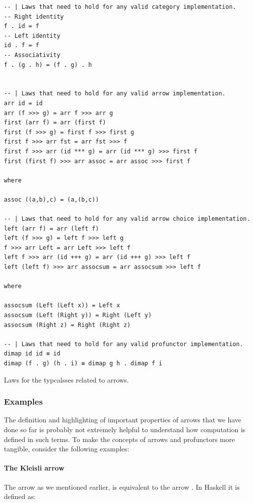 \begin{code}
\begin{verbatim}
-- | Laws that need to hold for any valid category implementation.
-- Right identity
f . id = f
-- Left identity
id . f = f
-- Associativity
f . (g . h) = (f . g) . h


-- | Laws that need to hold for any valid arrow implementation.
arr id = id
arr (f >>> g) = arr f >>> arr g
first (arr f) = arr (first f)
first (f >>> g) = first f >>> first g
first f >>> arr fst = arr fst >>> f
first f >>> arr (id *** g) = arr (id *** g) >>> first f
first (first f) >>> arr assoc = arr assoc >>> first f

where

assoc ((a,b),c) = (a,(b,c))

-- | Laws that need to hold for any valid arrow choice implementation.
left (arr f) = arr (left f)
left (f >>> g) = left f >>> left g
f >>> arr Left = arr Left >>> left f
left f >>> arr (id +++ g) = arr (id +++ g) >>> left f
left (left f) >>> arr assocsum = arr assocsum >>> left f

where

assocsum (Left (Left x)) = Left x
assocsum (Left (Right y)) = Right (Left y)
assocsum (Right z) = Right (Right z)

-- | Laws that need to hold for any valid profunctor implementation.
dimap id id ≡ id
dimap (f . g) (h . i) ≡ dimap g h . dimap f i
\end{verbatim}
  \caption{\label{lst:arrow_laws}Laws for the typcalsses related to
    arrows.}
\end{code}

\subsubsection{Examples}

The definition and highlighting of important properties of arrows that
we have done so far is probably not extremely helpful to understand
how computation is defined in such terms. To make the concepts of
arrows and profunctors more tangible, consider the following examples:

\paragraph{The Kleisli arrow}

The  arrow \cite{dawsonCompoundMonadsKleisli2007} as we
mentioned earlier, is equivalent to the arrow . In Haskell it is defined as:

